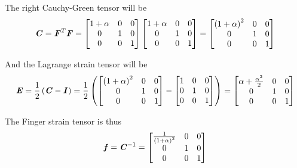 The right Cauchy-Green tensor will be
\begin{equation}
  \boldsymbol{\mathit{C}} = {\boldsymbol{\mathit{F}}}^{T}\boldsymbol{\mathit{F}} = \begin{bmatrix}
    1+\alpha & 0 & 0 \\
    0 & 1 & 0 \\
    0 & 0 & 1
  \end{bmatrix} \begin{bmatrix}
    1+\alpha & 0 & 0 \\
    0 & 1 & 0 \\
    0 & 0 & 1
  \end{bmatrix} = \begin{bmatrix}
    \left( 1+\alpha \right)^2 & 0 & 0 \\
    0 & 1 & 0 \\
    0 & 0 & 1
  \end{bmatrix}
\end{equation}

And the Lagrange strain tensor will be
\begin{equation}
  \boldsymbol{\mathit{E}} = \frac{1}{2}\left( \boldsymbol{\mathit{C}}-\boldsymbol{\mathit{I}} \right) = \frac{1}{2}\left( \begin{bmatrix}
    \left( 1+\alpha \right)^2 & 0 & 0 \\
    0 & 1 & 0 \\
    0 & 0 & 1
  \end{bmatrix} - \begin{bmatrix}
    1 & 0 & 0 \\
    0 & 1 & 0 \\
    0 & 0 & 1
  \end{bmatrix} \right) = \begin{bmatrix}
    \alpha+\frac{\alpha^2}{2} & 0 & 0 \\
    0 & 1 & 0 \\
    0 & 0 & 1
  \end{bmatrix}
\end{equation}

The Finger strain tensor is thus
\begin{equation}
  \boldsymbol{\mathit{f}} = {\boldsymbol{\mathit{C}}}^{-1} =  \begin{bmatrix}
    \frac{1}{\left( 1+\alpha \right)^2} & 0 & 0 \\
    0 & 1 & 0 \\
    0 & 0 & 1
  \end{bmatrix}
\end{equation}

